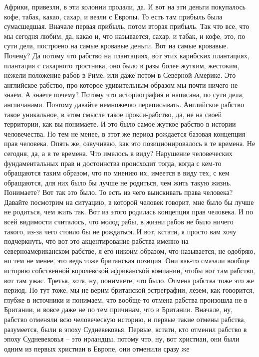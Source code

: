 Африки, привезли, в эти колонии продали, да. И вот на эти деньги покупалось
кофе, табак, какао, сахар, и везли с Европы. То есть там прибыль была
сумасшедшая. Вначале первая прибыль, потом вторая прибыль. Так что все, что мы
сегодня любим, да, какао и, что называется, сахар, и табак, и кофе, это, по сути
дела, построено на самые кровавые деньги. Вот на самые кровавые. Почему? Да
потому что рабство на плантациях, вот этих карибских плантациях, плантация с
сахарного тростника, оно было в разы более жутким, жестоким, нежели положение
рабов в Риме, или даже потом в Северной Америке. Это английское рабство, про
которое удивительным образом мы почти ничего не знаем. А знаете почему? Потому
что историография и написана, по сути дела, англичанами. Поэтому давайте
немножечко переписывать. Английское рабство такое уникальное, в этом смысле
такое прокси-рабство, да, не на своей территории, как вы понимаете. И это было
самое жуткое рабство в истории человечества. Но тем не менее, в этот же период
рождается базовая концепция прав человека. Опять же, озвучиваю, как это
позиционировалось в те времена. Не сегодня, да, а в те времена. Что имелось в
виду? Нарушение человеческих фундаментальных прав и достоинства происходит
тогда, когда с кем-то обращаются таким образом, что по мнению их, имеется в виду
тех, с кем обращаются, для них было бы лучше не родиться, чем жить такую жизнь.
Понимаете? Вот так это было. То есть из чего выискивать права человека? Давайте
посмотрим на ситуацию, в которой человек говорит, мне было бы лучше не родиться,
чем жить так. Вот из этого родилась концепция прав человека. И по всей видимости
считалось, что молод рабы, в жизни рабов не было ничего такого, из-за чего
стоило бы не рождаться. И вот, кстати, я просто вам хочу подчеркнуть, что вот
это акцентирование рабства именно на северноамериканском рабстве, я его никоим
образом, что называется, не одобряю, но тем не менее, это ведь тоже британская
позиция. Они как-то смазали вообще историю собственной королевской африканской
компании, чтобы вот там рабство, вот там ужас. Третья, хотя, ну, понимаете, что
было. Отмена рабства тоже это же период. Но тут тоже, мы не верим британской
эстреграфии, лезем, как говорится, глубже в источники и понимаем, что вообще-то
отмена рабства произошла не в Британии, и вовсе даже не по тем причинам, что в
Британии. Вначале, ну, рабство отменяли всю человеческую историю, и первые такие
отмены рабства, разумеется, были в эпоху Судневековья. Первые, кстати, кто
отменил рабство в эпоху Судневековья – это ирландцы, потому что, ну, вот
христиан, они были одним из первых христиан в Европе, они отменили сразу же
